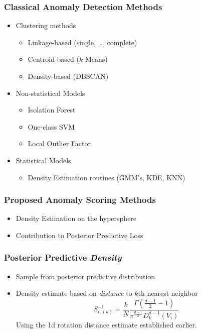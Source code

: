 \documentclass[aspectratio=169]{beamer}
\begin{document}
\begin{frame}
  \frametitle{Classical Anomaly Detection Methods}
  \begin{itemize}
    \item Clustering methods
      \begin{itemize}
        \item Linkage-based (single, \dots, complete)~\citep{ackerman2010}
        \item Centroid-based ($k$-Means)~\citep{hartigan1979} 
        \item Density-based (DBSCAN)~\cite{ester1996}
      \end{itemize}
    \item Non-statistical Models
      \begin{itemize}
        \item Isolation Forest~\citep{liu2000}
        \item One-class SVM~\cite{chang2011}
        \item Local Outlier Factor~\cite{breunig2000}
      \end{itemize}
    \item Statistical Models
      \begin{itemize}
        \item Density Estimation routines (GMM's, KDE, KNN)
      \end{itemize}
  \end{itemize}
\end{frame}

\begin{frame}
  \frametitle{Proposed Anomaly Scoring Methods}
  \begin{itemize}
    \item Density Estimation on the hypersphere
    \item Contribution to Posterior Predictive Loss
  \end{itemize}
\end{frame}

\begin{frame}
  \frametitle{Posterior Predictive \emph{Density}}
  \begin{itemize}
    \item Sample from posterior predictive distribution
    \item Density estimate based on \emph{distance} to $k$th nearest neighbor
    \begin{equation*}
        S_{i,(k)}^{-1} =
          \frac{k}{N}\frac{\Gamma\left(\frac{d-1}{2} - 1\right)}{\pi^{\frac{d-1}{2}}D_{k}^{d-1}(V_i)}
    \end{equation*}
    Using the 1d rotation distance estimate established earlier.
  \end{itemize}
\end{frame}
\end{document}
